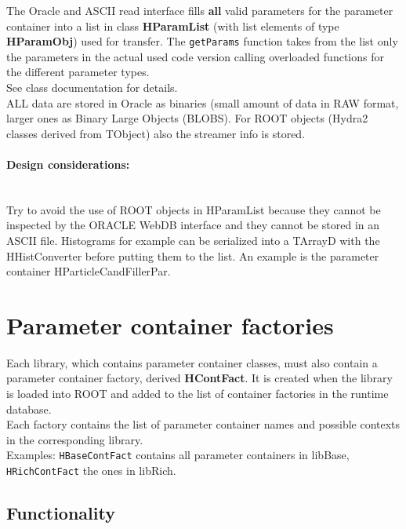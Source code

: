 The Oracle and ASCII read interface fills \textbf{all} valid parameters for the parameter container into a list in class 
\textbf{HParamList} (with list elements of type \textbf{HParamObj}) used for transfer. The \verb+getParams+ function takes from the list only the parameters in the 
actual used code version calling overloaded functions for the different parameter types.\\
See class documentation for details.\\

ALL data are stored in Oracle as binaries (small amount of data in RAW format, larger ones as Binary Large Objects 
(BLOBS). For ROOT objects (Hydra2 classes derived from TObject) also the streamer info is stored.

\paragraph{Design considerations:} ~\\
Try to avoid the use of ROOT objects in HParamList because they cannot be inspected by the ORACLE WebDB interface and they 
cannot be stored in an ASCII file. Histograms for example can be serialized into a TArrayD with the HHistConverter before putting 
them to the list. An example is the parameter container HParticleCandFillerPar.\\


\section[Parameter container factories]{Parameter container factories} \label{sec:rtdbContainerFactories}

Each library, which contains parameter container classes, must also contain a parameter container factory, derived
\textbf{HContFact}. It is created when the library is loaded into ROOT and added to the list of container factories 
in the runtime database.\\

Each factory contains the list of parameter container names and possible contexts in the corresponding library.\\
Examples: \verb+HBaseContFact+ contains all parameter containers in libBase, \verb+HRichContFact+ the ones in libRich.

\subsection*{Functionality}

